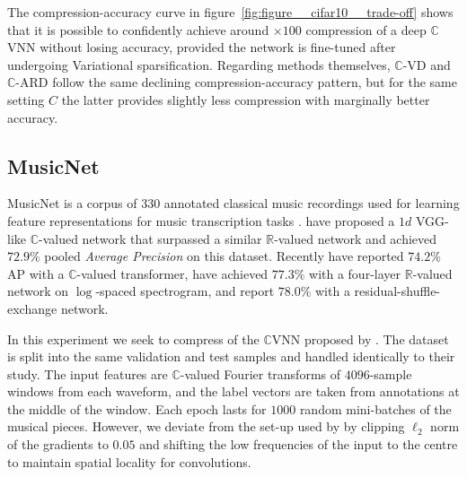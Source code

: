 \documentclass[a4paper,10pt,twocolumn]{article}
\newcommand{\real}{\mathbb{R}}
\newcommand{\cplx}{\mathbb{C}}
\begin{document}
The compression-accuracy curve in figure~\ref{fig:figure__cifar10__trade-off} shows that
it is possible to confidently achieve around $\times100$ compression of a deep $\cplx$VNN
without losing accuracy, provided the network is fine-tuned after undergoing Variational
sparsification. Regarding methods themselves, $\cplx$-VD and $\cplx$-ARD follow the same
declining compression-accuracy pattern, but for the same setting $C$ the latter provides
slightly less compression with marginally better accuracy.



\subsection{MusicNet} %
\label{sub:musicnet}



MusicNet is a corpus of $330$ annotated classical music recordings used for learning
feature representations for music transcription tasks \citep{thickstun_learning_2017}.
\citet{trabelsi_deep_2018} have proposed a $1d$ VGG-like $\cplx$-valued network that
surpassed a similar $\real$-valued network and achieved $72.9\%$ pooled \emph{Average
Precision} on this dataset. Recently \citet{yang_complex_2019} have reported $74.2\%$
AP with a $\cplx$-valued transformer, \citet{thickstun_invariances_2018} have achieved
$77.3\%$ with a four-layer $\real$-valued network on $\log$-spaced spectrogram, and
\citet{draguns_residual_2020} report $78.0\%$ with a residual-shuffle-exchange network.

In this experiment we seek to compress of the $\cplx$VNN proposed by \citet{trabelsi_deep_2018}.
%
The dataset is split into the same validation and test samples and handled identically
to their study. The input features are $\cplx$-valued Fourier transforms of $4096$-sample
windows from each waveform, and the label vectors are taken from annotations at the middle
of the window. Each epoch lasts for $1000$ random mini-batches of the musical pieces.
% 
However, we deviate from the set-up used by \citet{trabelsi_deep_2018} by clipping $\ell_2$
norm of the gradients to $0.05$ and shifting the low frequencies of the input to the centre
to maintain spatial locality for convolutions.
\end{document}
